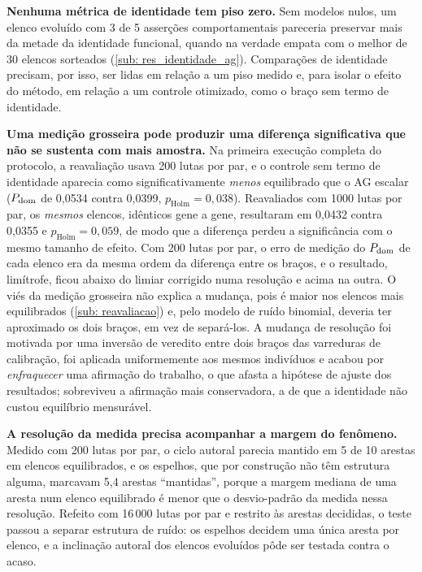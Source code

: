 \textbf{Nenhuma métrica de identidade tem piso zero.} Sem modelos nulos, um elenco evoluído com 3 de 5 asserções comportamentais pareceria preservar mais da metade da identidade funcional, quando na verdade empata com o melhor de 30 elencos sorteados (\autoref{sub: res_identidade_ag}). Comparações de identidade precisam, por isso, ser lidas em relação a um piso medido e, para isolar o efeito do método, em relação a um controle otimizado, como o braço sem termo de identidade.

\textbf{Uma medição grosseira pode produzir uma diferença significativa que não se sustenta com mais amostra.} Na primeira execução completa do protocolo, a reavaliação usava 200 lutas por par, e o controle sem termo de identidade aparecia como significativamente \textit{menos} equilibrado que o AG escalar ($P_{\mathrm{dom}}$ de 0,0534 contra 0,0399, $p_{\mathrm{Holm}} = 0{,}038$). Reavaliados com 1000 lutas por par, os \textit{mesmos} elencos, idênticos gene a gene, resultaram em 0,0432 contra 0,0355 e $p_{\mathrm{Holm}} = 0{,}059$, de modo que a diferença perdeu a significância com o mesmo tamanho de efeito. Com 200 lutas por par, o erro de medição do $P_{\mathrm{dom}}$ de cada elenco era da mesma ordem da diferença entre os braços, e o resultado, limítrofe, ficou abaixo do limiar corrigido numa resolução e acima na outra. O viés da medição grosseira não explica a mudança, pois é maior nos elencos mais equilibrados (\autoref{sub: reavaliacao}) e, pelo modelo de ruído binomial, deveria ter aproximado os dois braços, em vez de separá-los. A mudança de resolução foi motivada por uma inversão de veredito entre dois braços das varreduras de calibração, foi aplicada uniformemente aos mesmos indivíduos e acabou por \textit{enfraquecer} uma afirmação do trabalho, o que afasta a hipótese de ajuste dos resultados; sobreviveu a afirmação mais conservadora, a de que a identidade não custou equilíbrio mensurável.

\textbf{A resolução da medida precisa acompanhar a margem do fenômeno.} Medido com 200 lutas por par, o ciclo autoral parecia mantido em 5 de 10 arestas em elencos equilibrados, e os espelhos, que por construção não têm estrutura alguma, marcavam 5,4 arestas ``mantidas'', porque a margem mediana de uma aresta num elenco equilibrado é menor que o desvio-padrão da medida nessa resolução. Refeito com 16\,000 lutas por par e restrito às arestas decididas, o teste passou a separar estrutura de ruído: os espelhos decidem uma única aresta por elenco, e a inclinação autoral dos elencos evoluídos pôde ser testada contra o acaso.

